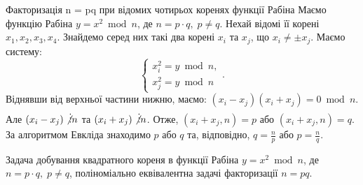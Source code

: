 \begin{algorithm}{Факторизація n = pq при відомих чотирьох коренях функції Рабіна}
Маємо функцію Рабіна $y = x ^{2} \bmod n$, де $n = p \cdot q,\; p \neq q$. Нехай відомі її корені $x_1, x_2, x_3, x_4$. Знайдемо серед них такі два корені $x_i$ та $x_j$, що $x_i \neq \pm x_j$. Маємо систему:
\begin{equation*}
\begin{cases}
        x^2_i = y \bmod n,\\
        x^2_j = y \bmod n
\end{cases}.
\end{equation*}
Віднявши від верхньої частини нижню, маємо: $(x_i-x_j)(x_i+x_j) = 0 \bmod n$. Але $(x_i-x_j) \not\vdots n$ та $(x_i+x_j) \not\vdots n$. Отже, $(x_i+x_j, n) = p$ або $(x_i+x_j, n) = q$.
За алгоритмом Евкліда знаходимо $p$ або $q$ та, відповідно, $q = \frac{n}{p}$ або $p = \frac{n}{q}$.
\end{algorithm}
\begin{claim}
Задача добування квадратного кореня в функції Рабіна $y = x ^{2} \bmod n$, де $n = p \cdot q,\; p \neq q$, поліноміально еквівалентна задачі факторизації $n = pq$.
\end{claim}
